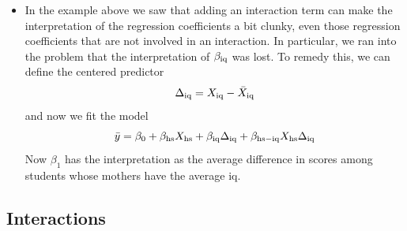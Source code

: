 \begin{itemize}
\begin{example}
\end{example}

\item In the example above we saw that adding an interaction term can make the interpretation  of the regression coefficients a bit clunky, even those regression coefficients that are not involved in an interaction. In particular, we ran into the problem that the interpretation of $\beta_{\rm iq}$ was lost. To remedy this, we can define the centered predictor
\begin{equation*}
\Delta_{\rm iq} = X_{\rm iq} - \bar{X}_{\rm iq} 
\end{equation*}
and now we fit the model 
\begin{equation*}
\bar{y} =  \beta_0 +  \beta_{\rm hs} X_{\rm hs} + \beta_{\rm iq}\Delta_{\rm iq} +  \beta_{\rm hs-iq}X_{\rm hs}\Delta_{\rm iq}
\end{equation*}
Now $\beta_1$ has the interpretation as the average difference in scores among students whose mothers have the average iq. 
\end{itemize}





\subsection{Interactions}



